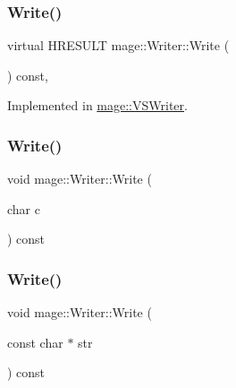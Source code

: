 \hypertarget{classmage_1_1_writer_a674375dbb233dea030603212d4090c18}{}\label{classmage_1_1_writer_a674375dbb233dea030603212d4090c18} 
\subsubsection{\texorpdfstring{Write()}{Write()}\hspace{0.1cm}{\footnotesize\ttfamily [1/3]}}
{\footnotesize\ttfamily virtual H\+R\+E\+S\+U\+LT mage\+::\+Writer\+::\+Write (\begin{DoxyParamCaption}{ }\end{DoxyParamCaption}) const\hspace{0.3cm}{\ttfamily [protected]}, {}}



Implemented in \hyperlink{classmage_1_1_v_s_writer_afda5e71bc0c5c836ab439e2572dcd685}{mage\+::\+V\+S\+Writer}.

\hypertarget{classmage_1_1_writer_aaa7908147290e06991ef18d5931e606b}{}\label{classmage_1_1_writer_aaa7908147290e06991ef18d5931e606b} 
\subsubsection{\texorpdfstring{Write()}{Write()}\hspace{0.1cm}{\footnotesize\ttfamily [2/3]}}
{\footnotesize\ttfamily void mage\+::\+Writer\+::\+Write (\begin{DoxyParamCaption}\item[{char}]{c }\end{DoxyParamCaption}) const\hspace{0.3cm}{\ttfamily [protected]}}

\hypertarget{classmage_1_1_writer_a0ac4d904f988028361a99e1f25e273ab}{}\label{classmage_1_1_writer_a0ac4d904f988028361a99e1f25e273ab} 
\subsubsection{\texorpdfstring{Write()}{Write()}\hspace{0.1cm}{\footnotesize\ttfamily [3/3]}}
{\footnotesize\ttfamily void mage\+::\+Writer\+::\+Write (\begin{DoxyParamCaption}\item[{const char $\ast$}]{str }\end{DoxyParamCaption}) const\hspace{0.3cm}{\ttfamily [protected]}}

